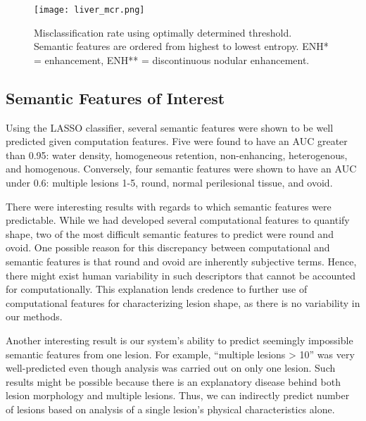 \begin{figure}
	\centering
	\texttt{[image: liver\_mcr.png]}
	\caption[MCR results for liver annotation]{Misclassification rate using optimally determined threshold. Semantic features are ordered from highest to lowest entropy. ENH* = enhancement, ENH** = discontinuous nodular enhancement.}
	\label{fig:liver_mcr}
\end{figure}


\clearpage


\subsection{Semantic Features of Interest}
Using the LASSO classifier, several semantic features were shown to be well predicted given computation features. Five were found to have an AUC greater than 0.95: water density, homogeneous retention, non-enhancing, heterogenous, and homogenous.
Conversely, four semantic features were shown to have an AUC under 0.6: multiple lesions 1-5, round, normal perilesional tissue, and ovoid.

There were interesting results with regards to which semantic features were predictable. While we had developed several computational features to quantify shape, two of the most difficult semantic features to predict were round and ovoid. One possible reason for this discrepancy between computational and semantic features is that round and ovoid are inherently subjective terms. Hence, there might exist human variability in such descriptors that cannot be accounted for computationally. This explanation lends credence to further use of computational features for characterizing lesion shape, as there is no variability in our methods.

Another interesting result is our system's ability to predict seemingly impossible semantic features from one lesion. For example, ``multiple lesions > 10'' was very well-predicted even though analysis was carried out on only one lesion. Such results might be possible because there is an explanatory disease behind both lesion morphology and multiple lesions. Thus, we can indirectly predict number of lesions based on analysis of a single lesion's physical characteristics alone.

